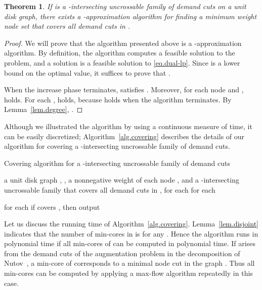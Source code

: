 \documentclass[11pt]{article}
\newtheorem{theorem}{Theorem}
\begin{document}
  \begin{theorem}
   \label{thm.coveringuncross}
  If  is a -intersecting uncrossable family of demand cuts on a unit disk graph,
  there exists a -approximation algorithm for finding a minimum
  weight node set that covers all demand cuts in .
  \end{theorem}
  \begin{proof}
  We will prove that the algorithm presented above is a -approximation
   algorithm.
   By definition, the algorithm computes a feasible solution
    to the problem, and a solution 
  is a feasible solution to \eqref{eq.dual-lp}.
   Since  is a lower bound on the optimal value, it suffices to prove that .
   
   When the increase phase terminates,
    satisfies
 .
   Moreover,
   for each node  and ,
    holds.
   For each ,
    holds,
   because  holds
 when the algorithm terminates.
 By Lemma~\ref{lem.degree},
 .
  \end{proof}

    Although we illustrated the algorithm by using a continuous measure of time,
  it can be easily discretized;
  Algorithm~\ref{alg.covering} 
  describes the details of our algorithm
  for covering a -intersecting uncrossable family of demand cuts.

     \begin{algorithm}
  \caption{Covering algorithm for a -intersecting uncrossable family of demand cuts}
  \label{alg.covering}
  \begin{algorithmic}
   \REQUIRE
   a unit disk graph , ,
   a nonnegative weight  of each node ,
   and a -intersecting uncrossable family  
   \ENSURE  that covers all demand cuts in 
   \STATE  , 
   \STATE  for each 
   \WHILE{}
   \STATE 
   \STATE 
   \STATE  for each 
   \STATE
   
   \STATE  
   \STATE 
   \STATE 
   for each 
   \ENDWHILE
   \FOR{}
   \STATE if  covers , then 
   \ENDFOR
   \STATE output 
  \end{algorithmic}
   \end{algorithm}



   

Let us discuss the running time of Algorithm~\ref{alg.covering}.
Lemma~\ref{lem.disjoint} indicates that the number of
min-cores in  is  for any .
Hence the algorithm runs in polynomial time if all min-cores of
 can be computed in polynomial time.
If  arises from the demand cuts of the augmentation problem in
the decomposition of Nutov~\cite{Nutov12},
a min-core of 
 corresponds to a minimal node cut in the graph .
Thus all min-cores can be computed by applying a max-flow algorithm
repeatedly in this case.
  
\end{document}
